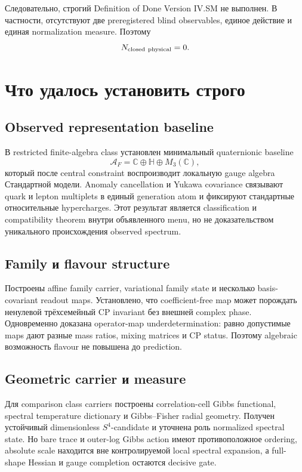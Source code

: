 Следовательно, строгий Definition of Done Version IV.SM не выполнен. В
частности, отсутствуют две preregistered blind observables, единое действие и
единая normalization measure. Поэтому
\begin{equation}
 N_{\rm closed\ physical}=0.
 \label{eq:tome-four-zero-physical-closure}
\end{equation}

\section{Что удалось установить строго}

\subsection{Observed representation baseline}

В restricted finite-algebra class установлен минимальный quaternionic
baseline
\begin{equation}
 \mathcal A_F=\mathbb C\oplus\mathbb H\oplus M_3(\mathbb C),
\end{equation}
который после central constraint воспроизводит локальную gauge algebra
Стандартной модели. Anomaly cancellation и Yukawa covariance связывают
quark и lepton multiplets в единый generation atom и фиксируют стандартные
относительные hypercharges. Этот результат является classification и
compatibility theorem внутри объявленного menu, но не доказательством
уникального происхождения observed spectrum.

\subsection{Family и flavour structure}

Построены affine family carrier, variational family state и несколько
basis-covariant readout maps. Установлено, что coefficient-free map может
порождать ненулевой трёхсемейный CP invariant без внешней complex phase.
Одновременно доказана operator-map underdetermination: равно допустимые maps
дают разные mass ratios, mixing matrices и CP status. Поэтому algebraic
возможность flavour не повышена до prediction.

\subsection{Geometric carrier и measure}

Для comparison class carriers построены correlation-cell Gibbs functional,
spectral temperature dictionary и Gibbs--Fisher radial geometry. Получен
устойчивый dimensionless \(S^4\)-candidate и уточнена роль normalized
spectral state. Но bare trace и outer-log Gibbs action имеют противоположное
ordering, absolute scale находится вне контролируемой local spectral
expansion, а full-shape Hessian и gauge completion остаются decisive gate.


